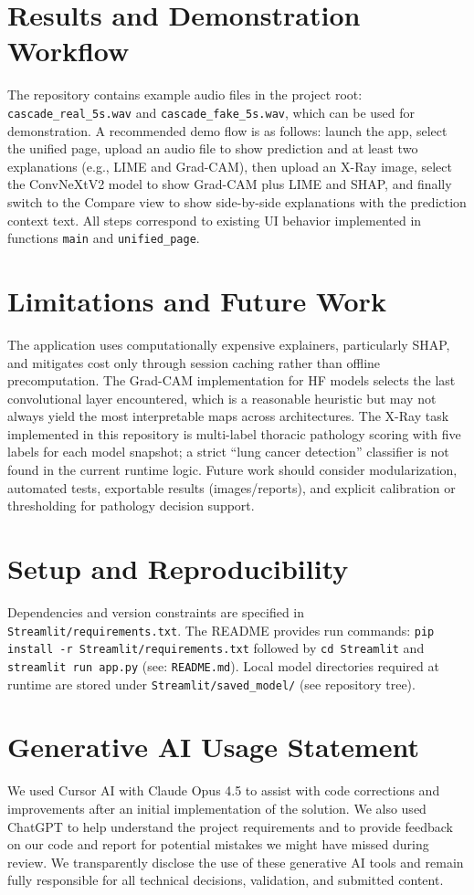 \documentclass[11pt,a4paper]{article}
\begin{document}
\section{Results and Demonstration Workflow}
The repository contains example audio files in the project root: \texttt{cascade\_real\_5s.wav} and \texttt{cascade\_fake\_5s.wav}, which can be used for demonstration. A recommended demo flow is as follows: launch the app, select the unified page, upload an audio file to show prediction and at least two explanations (e.g., LIME and Grad-CAM), then upload an X-Ray image, select the ConvNeXtV2 model to show Grad-CAM plus LIME and SHAP, and finally switch to the Compare view to show side-by-side explanations with the prediction context text. All steps correspond to existing UI behavior implemented in functions \texttt{main} and \texttt{unified\_page}.

\section{Limitations and Future Work}
The application uses computationally expensive explainers, particularly SHAP, and mitigates cost only through session caching rather than offline precomputation. The Grad-CAM implementation for HF models selects the last convolutional layer encountered, which is a reasonable heuristic but may not always yield the most interpretable maps across architectures. The X-Ray task implemented in this repository is multi-label thoracic pathology scoring with five labels for each model snapshot; a strict ``lung cancer detection'' classifier is not found in the current runtime logic. Future work should consider modularization, automated tests, exportable results (images/reports), and explicit calibration or thresholding for pathology decision support.

\section{Setup and Reproducibility}
Dependencies and version constraints are specified in \texttt{Streamlit/requirements.txt}. The README provides run commands: \texttt{pip install -r Streamlit/requirements.txt} followed by \texttt{cd Streamlit} and \texttt{streamlit run app.py} (see: \texttt{README.md}). Local model directories required at runtime are stored under \texttt{Streamlit/saved\_model/} (see repository tree).

\section*{Generative AI Usage Statement}
We used Cursor AI with Claude Opus 4.5 to assist with code corrections and improvements after an initial implementation of the solution. We also used ChatGPT to help understand the project requirements and to provide feedback on our code and report for potential mistakes we might have missed during review. We transparently disclose the use of these generative AI tools and remain fully responsible for all technical decisions, validation, and submitted content.
\end{document}
